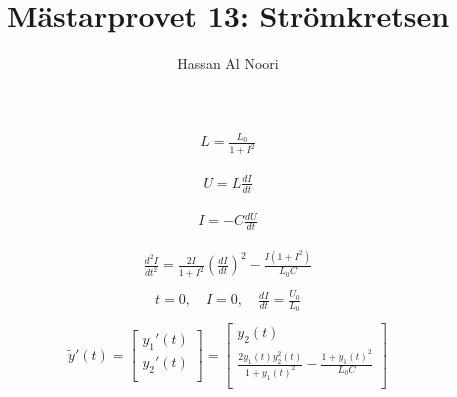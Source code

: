 \documentclass[a4paper]{article}
\title{Mästarprovet 13: Strömkretsen}
\author{Hassan Al Noori}
\begin{document}
\begin{Huge}


\begin{align*}
L = \frac{L_{0}}{1+I^{2}}
\end{align*} 

\begin{align*}
U = L\frac{dI}{dt}
\end{align*} 


\begin{align*}
I = -C\frac{dU}{dt}
\end{align*}

\begin{align*}
\frac{d^{2}I}{dt^{2}}= \frac{2I}{1+I^{2}}\left(\frac{dI}{dt}\right)^{2}-\frac{I(1+I^{2})}{L_{0}C}
\end{align*}
\begin{align*}\\
t=0, \quad I=0, \quad \frac{dI}{dt}=\frac{U_{0}}{L_{0}}
\end{align*}
\begin{align*}\\
\tilde{y}'(t) =
\begin{bmatrix}
y_{1}'(t) \\ 
y_{2}'(t) \\
\end{bmatrix}
= \begin{bmatrix}
y_{2}(t)\\
\frac{2y_{1}(t)y_{2}^{2}(t)}{1+y_{1}(t)^2}-\frac{1+y_{1}(t)^{2}}{L_{0}C}\\
\end{bmatrix}
\end{align*}
\end{Huge}
\end{document}
